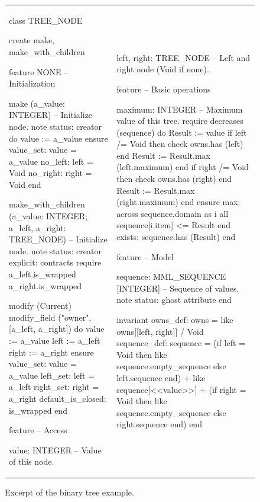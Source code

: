 \documentclass[a4paper,12pt]{article}
\begin{document}
\begin{figure}
\begin{adjustwidth}{-4pt}{-4pt}
\begin{tabular}{ll}
{\begin{erunning}[basicstyle=\scriptsize,numbers=left]
class TREE_NODE

create
	make, make_with_children

feature {NONE} -- Initialization

	make (a_value: INTEGER)
			-- Initialize node.
		note
			status: creator
		do
			value := a_value
		ensure
			value_set: value = a_value
			no_left: left = Void
			no_right: right = Void
		end

	make_with_children (a_value: INTEGER; 
			    a_left, a_right: TREE_NODE)
			-- Initialize node.
		note
			status: creator
			explicit: contracts
		require
			a_left.is_wrapped
			a_right.is_wrapped

			modify (Current)
			modify_field ("owner", [a_left, a_right])
		do
			value := a_value
			left := a_left
			right := a_right
		ensure
			value_set: value = a_value
			left_set: left = a_left
			right_set: right = a_right
			default_is_closed: is_wrapped
		end

feature -- Access

	value: INTEGER
			-- Value of this node.
\end{erunning}}
&
\hspace{4mm}
{\begin{erunning}[basicstyle=\scriptsize,numbers=left,firstnumber=last]

	left, right: TREE_NODE
			-- Left and right node (Void if none).

feature -- Basic operations

	maximum: INTEGER
			-- Maximum value of this tree.
		require
			decreases (sequence)
		do
			Result := value
			if left /= Void then
				check owns.has (left) end
				Result := Result.max (left.maximum)
			end
			if right /= Void then
				check owns.has (right) end
				Result := Result.max (right.maximum)
			end
		ensure
			max: across sequence.domain as i all 
			                sequence[i.item] <= Result end
			exists: sequence.has (Result)
		end

feature -- Model

	sequence: MML_SEQUENCE [INTEGER]
			-- Sequence of values.
		note
			status: ghost
		attribute
		end

invariant
	owns_def: owns = {like owns}[[left, right]] / Void
	sequence_def: sequence =
		(if left = Void 
		   then {like sequence}.empty_sequence 
		   else left.sequence end) +
		{like sequence}[<<value>>] +
		(if right = Void 
		   then {like sequence}.empty_sequence 
		   else right.sequence end)
end
\end{erunning}}
\end{tabular}
\end{adjustwidth}
\caption{Excerpt of the binary tree example.}
\label{code:tree_node}
\end{figure}
\end{document}
